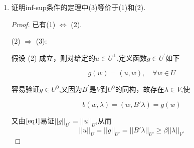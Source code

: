 \documentclass[12pt,a4paper]{article}
\begin{document}
\begin{enumerate}
	
		Stokes问题:
		
		$$\begin{cases}-\Delta\mathbf{u}+\nabla p=\mathbf{f},\text{在}\Omega\text{内}\\\operatorname{div}\mathbf{u}=0,\text{在}\Omega\text{内}\\\mathbf{u}|_{\partial\Omega}=0\end{cases}$$
		
		\begin{proof}
			在$-\Delta\mathbf{u}+\nabla p=\mathbf{f}$中，对$\forall \mathbf{v} \in (H_0^1(\Omega))^2$有
			
			$$\int_\Omega -\Delta \mathbf{u} \cdot \mathbf{v} + \nabla p \mathbf{v} dx = \int_{\Omega} \mathbf{f} \mathbf{v} dx$$
			
			利用两次Green公式和$\mathbf{v}|_{\partial\Omega}=\frac{\partial \mathbf{v}}{\partial \mathbf{n}}|_{\partial\Omega}=0$以及散度积分公式可得
				
			$$\int_\Omega \nabla \mathbf{u} : \nabla \mathbf{v} + div\mathbf{v} p  dx = \int_{\Omega} \mathbf{f} \mathbf{v} dx$$
			
			在$div\mathbf{u}=0$中，对$\forall q \in L_0^2(\Omega)$，有
			
			$$\int_{\Omega} div\mathbf{u} q dx = 0$$
			
			得到混合变分形式.
		\end{proof}
		\item 证明inf-sup条件的定理中(3)等价于(1)和(2). 
		
		\begin{proof}
			已有(1) $\Leftrightarrow$ (2).
			
			(2) $\Rightarrow$ (3):
			
			假设 (2) 成立，则对给定的$u\in U^\perp$,定义函数$g\in U^\prime$如下
			
			
			\begin{equation}\tag{$\ast$} \label{eq1}
				g(w)=(u,w),\quad\forall w\in U
			\end{equation}
				
			容易验证$g\in U^0$,又因为$B^\prime$是$V$到$U^0$的同构，故存在$\lambda\in V$,使
			
			\begin{equation}\tag{$\star$} \label{eq2}
				b(w,\lambda)=(w,B'\lambda)=g(w)
			\end{equation}
			
			又由$\eqref{eq1}$易证$||g||_{U^{\prime}}=||u||_{U}$,从而
			$$||u||_U=||g||_{U'}=||B'\lambda||_{U'}\geq\beta||\lambda||_V.$$
			

\end{proof}
\end{enumerate}
\end{document}
